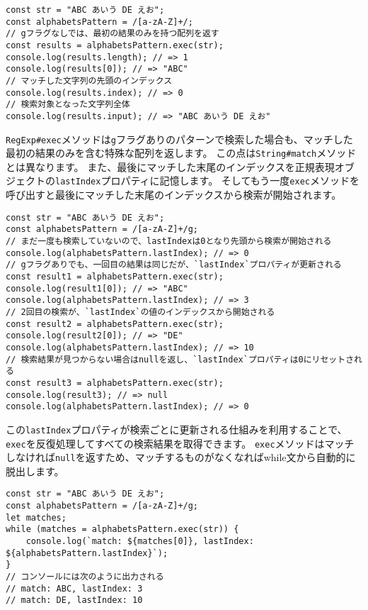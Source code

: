 \begin{lstlisting}
const str = "ABC あいう DE えお";
const alphabetsPattern = /[a-zA-Z]+/;
// gフラグなしでは、最初の結果のみを持つ配列を返す
const results = alphabetsPattern.exec(str);
console.log(results.length); // => 1
console.log(results[0]); // => "ABC"
// マッチした文字列の先頭のインデックス
console.log(results.index); // => 0
// 検索対象となった文字列全体
console.log(results.input); // => "ABC あいう DE えお"
\end{lstlisting}

\texttt{RegExp\#exec}メソッドは\texttt{g}フラグありのパターンで検索した場合も、マッチした最初の結果のみを含む特殊な配列を返します。
この点は\texttt{String\#match}メソッドとは異なります。
また、最後にマッチした末尾のインデックスを正規表現オブジェクトの\texttt{lastIndex}プロパティに記憶します。
そしてもう一度\texttt{exec}メソッドを呼び出すと最後にマッチした末尾のインデックスから検索が開始されます。

\begin{lstlisting}
const str = "ABC あいう DE えお";
const alphabetsPattern = /[a-zA-Z]+/g;
// まだ一度も検索していないので、lastIndexは0となり先頭から検索が開始される
console.log(alphabetsPattern.lastIndex); // => 0
// gフラグありでも、一回目の結果は同じだが、`lastIndex`プロパティが更新される
const result1 = alphabetsPattern.exec(str);
console.log(result1[0]); // => "ABC"
console.log(alphabetsPattern.lastIndex); // => 3
// 2回目の検索が、`lastIndex`の値のインデックスから開始される
const result2 = alphabetsPattern.exec(str);
console.log(result2[0]); // => "DE"
console.log(alphabetsPattern.lastIndex); // => 10
// 検索結果が見つからない場合はnullを返し、`lastIndex`プロパティは0にリセットされる
const result3 = alphabetsPattern.exec(str);
console.log(result3); // => null
console.log(alphabetsPattern.lastIndex); // => 0
\end{lstlisting}

この\texttt{lastIndex}プロパティが検索ごとに更新される仕組みを利用することで、\texttt{exec}を反復処理してすべての検索結果を取得できます。
\texttt{exec}メソッドはマッチしなければ\texttt{null}を返すため、マッチするものがなくなればwhile文から自動的に脱出します。

\begin{lstlisting}
const str = "ABC あいう DE えお";
const alphabetsPattern = /[a-zA-Z]+/g;
let matches;
while (matches = alphabetsPattern.exec(str)) {
    console.log(`match: ${matches[0]}, lastIndex: ${alphabetsPattern.lastIndex}`);
}
// コンソールには次のように出力される
// match: ABC, lastIndex: 3
// match: DE, lastIndex: 10
\end{lstlisting}

